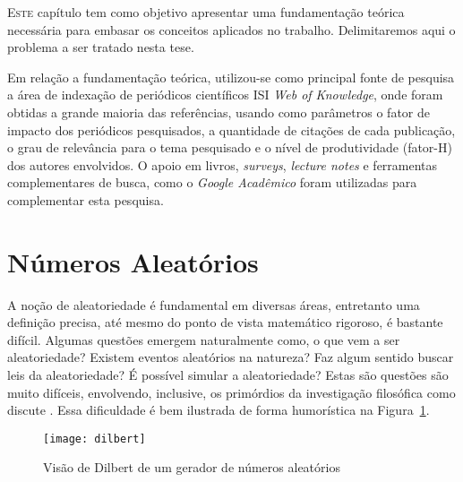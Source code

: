 
\lettrine{E}{ste} capítulo tem como objetivo apresentar uma fundamentação teórica necessária para embasar os conceitos aplicados no trabalho.
Delimitaremos aqui o problema a ser tratado nesta tese.

Em relação a fundamentação teórica, utilizou-se como principal fonte de pesquisa a área de indexação de periódicos científicos ISI \emph{Web of Knowledge}, onde foram obtidas a grande maioria das referências, usando como parâmetros o fator de impacto dos periódicos pesquisados, a quantidade de citações de cada publicação, o grau de relevância para o tema pesquisado e o nível de produtividade (fator-H) dos autores envolvidos. 
O apoio em livros, \textit{surveys}, \textit{lecture notes} e ferramentas complementares de busca, como o \emph{Google Acadêmico} foram utilizadas para complementar esta pesquisa.

\section{Números Aleatórios} %

A noção de aleatoriedade é fundamental em diversas áreas, entretanto uma definição precisa, até mesmo do ponto de vista matemático rigoroso, é bastante difícil. 
Algumas questões emergem naturalmente como, o que vem a ser aleatoriedade? 
Existem eventos aleatórios na natureza? 
Faz algum sentido buscar leis da aleatoriedade? 
É possível simular a aleatoriedade? 
Estas são questões são muito difíceis, envolvendo, inclusive, os primórdios da investigação filosófica como discute \citep{Volchan:02}.
Essa dificuldade é bem ilustrada de forma humorística na Figura~\ref{fig:Dilbert}.

\begin{figure}[hbt]
\centering
\texttt{[image: dilbert]}
\caption{Visão de Dilbert de um gerador de números aleatórios}\label{fig:Dilbert}
\end{figure}

